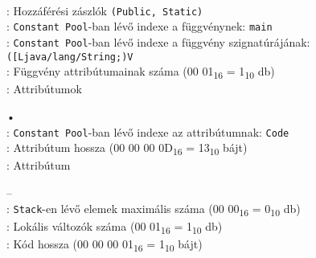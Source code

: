 \begin{compactitem}
\begin{compactitem}
\begin{compactitem}
\begin{compactitem}
        \end{compactitem}
    \end{compactitem}
	\item {}     \\
    : Hozzáférési zászlók \lstinline{(Public, Static)} \\
    : \lstinline{Constant Pool}-ban lévő indexe a függvénynek: \lstinline{main} \\
    : \lstinline{Constant Pool}-ban lévő indexe a függvény szignatúrájának: \lstinline{([Ljava/lang/String;)V} \\
    : Függvény attribútumainak száma (00 01\textsubscript{16} = 1\textsubscript{10} db) \\
    : Attribútumok
    \begin{compactitem}
        \setlength\itemsep{-5px}
        \item[•]    \\
        : \lstinline{Constant Pool}-ban lévő indexe az attribútumnak: \lstinline{Code} \\
        : Attribútum hossza (00 00 00 0D\textsubscript{16} = 13\textsubscript{10} bájt) \\
        : Attribútum
            \begin{compactitem}
            \setlength\itemsep{0px}
                \item[–]       \\
                : \lstinline{Stack}-en lévő elemek maximális száma (00 00\textsubscript{16} = 0\textsubscript{10} db) \\
                : Lokális változók száma (00 01\textsubscript{16} = 1\textsubscript{10} db) \\
                : Kód hossza (00 00 00 01\textsubscript{16} = 1\textsubscript{10} bájt) \\

\end{compactitem}
\end{compactitem}
\end{compactitem}
\end{compactitem}
